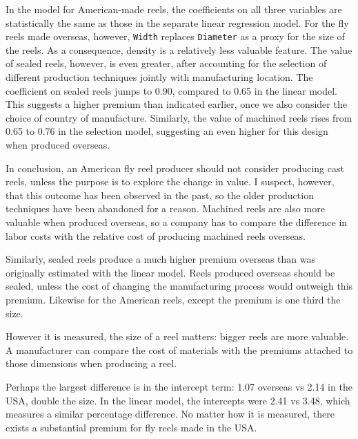\documentclass[11pt]{paper}
\begin{document}
In the model for American-made reels,
the coefficients on all three variables are statistically
the same as those in the separate linear regression model.
% 
For the fly reels made overseas, however,
\texttt{Width} replaces \texttt{Diameter} as a proxy for the size of the reels.
As a consequence, density is a relatively less valuable feature.
The value of sealed reels, however, is even greater,
after accounting for the selection of different production techniques
jointly with manufacturing location.
The coefficient on sealed reels jumps to 0.90, compared to 0.65
in the linear model.
This suggests a higher premium than indicated earlier,
once we also consider the choice of country of manufacture.
Similarly, the value of machined reels rises from 0.65 to 0.76
in the selection model, suggesting an even higher
for this design when produced overseas.


In conclusion, an American fly reel producer should not consider
producing cast reels, unless the purpose is to explore the change in value.
I suspect, however, that this outcome has been observed in
the past, so the older production techniques have been abandoned for a reason.
Machined reels are also more valuable when produced overseas,
so a company has to compare the difference in labor costs with the relative
cost of producing machined reels overseas.

Similarly, sealed reels produce a much higher premium overseas
than was originally estimated with the linear model.
Reels produced overseas should be sealed, unless the cost of
changing the manufacturing process would outweigh this premium.
Likewise for the American reels, except the premium is one third the size.

However it is measured, the size of a reel matters:
bigger reels are more valuable.
A manufacturer can compare the cost of materials with
the premiums attached to those dimensions when producing a reel.

Perhaps the largest difference is in the intercept term:
1.07 overseas vs 2.14 in the USA, double the size.
In the linear model, the intercepts were 2.41 vs 3.48,
which measures a similar percentage difference.
No matter how it is measured, there exists a substantial premium
for fly reels made in the USA.




\end{document}
